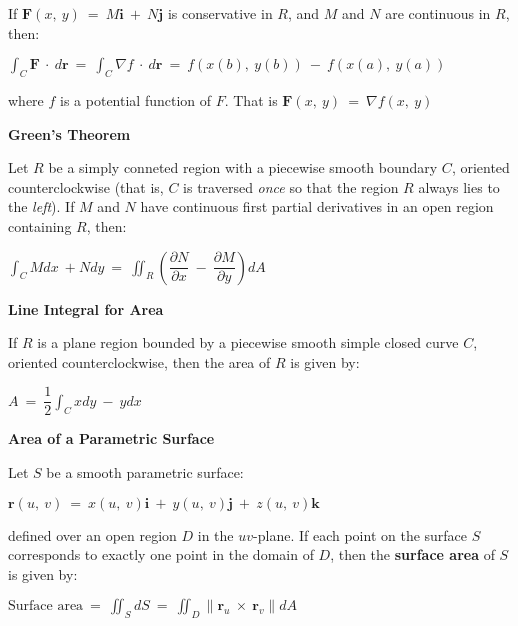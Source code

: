 \documentclass{article}
\begin{document}
\begin{large}
\hspace{0.1in} If $\textbf{F}(x,\ y)\ =\ M\textbf{i}\ +\ N\textbf{j}$ is conservative in $R$, and $M$ and $N$ are continuous in $R$, then:

\hspace{1.0in} $\displaystyle\int_{C}\textbf{F}\ \cdot\ d\textbf{r}\ =\ \displaystyle\int_{C}\nabla f\ \cdot\ d\textbf{r}\ =\ f(x(b),\ y(b))\ -\ f(x(a),\ y(a))$

\hspace{0.1in} where $f$ is a potential function of $F$.  That is $\textbf{F}(x,\ y)\ =\ \nabla f(x,\ y)$

\textbf{Green's Theorem}

\hspace{0.1in} Let $R$ be a simply conneted region with a piecewise smooth boundary $C$, oriented counterclockwise (that is, $C$ is traversed \textit{once} so that the region $R$ always lies to the \textit{left}). If $M$ and $N$ have continuous first partial derivatives in an open region containing $R$, then:

\hspace{2.0in} $\displaystyle\int_{C}Mdx\ + Ndy\ =\ \displaystyle\iint_{R}\left(\dfrac{\partial N}{\partial x}\ -\ \dfrac{\partial M}{\partial y}\right)dA$

\textbf{Line Integral for Area}

\hspace{0.1in} If $R$ is a plane region bounded by a piecewise smooth simple closed curve $C$, oriented counterclockwise, then the area of $R$ is given by:

\hspace{2.5in} $A\ =\ \dfrac{1}{2}\displaystyle\int_{C}xdy\ -\ ydx$

\vspace{1.0in}
\textbf{Area of a Parametric Surface}

\hspace{0.1in} Let $S$ be a smooth parametric surface:

\hspace{1.0in} $\textbf{r}(u,\ v)\ =\ x(u,\ v)\textbf{i}\ +\ y(u,\ v)\textbf{j}\ +\ z(u,\ v)\textbf{k}$

\hspace{0.1in} defined over an open region $D$ in the $uv$-plane.  If each point on the surface $S$ corresponds to exactly one point in the domain of $D$, then the \textbf{surface area} of $S$ is given by:

\vspace{-0.2in}
\hspace{1.0in} $\text{Surface area}\ =\ \displaystyle\iint_{S}dS\ =\ \displaystyle\iint_{D}\|\textbf{r}_{u}\ \times\ \textbf{r}_{v}\|dA$


\end{large}
\end{document}
